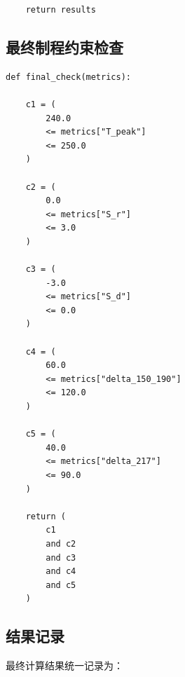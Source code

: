 \documentclass{cumcmthesis}
\begin{document}
\begin{appendices}
\begin{verbatim}
    return results
\end{verbatim}


\subsection{最终制程约束检查}

\begin{verbatim}
def final_check(metrics):

    c1 = (
        240.0
        <= metrics["T_peak"]
        <= 250.0
    )

    c2 = (
        0.0
        <= metrics["S_r"]
        <= 3.0
    )

    c3 = (
        -3.0
        <= metrics["S_d"]
        <= 0.0
    )

    c4 = (
        60.0
        <= metrics["delta_150_190"]
        <= 120.0
    )

    c5 = (
        40.0
        <= metrics["delta_217"]
        <= 90.0
    )

    return (
        c1
        and c2
        and c3
        and c4
        and c5
    )
\end{verbatim}


\subsection{结果记录}

最终计算结果统一记录为：


\end{appendices}
\end{document}
